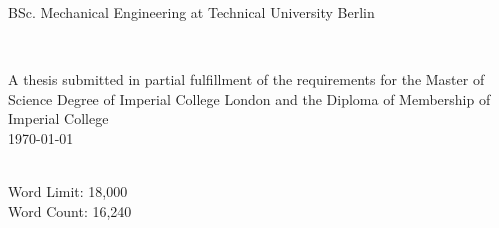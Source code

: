 \begin{titlepage}
\begin{minipage}{0.4\textwidth}
\centering \large
BSc. Mechanical Engineering at Technical University Berlin \\[1.2em] %
\end{minipage}\\[1cm]
\makeatother %
 \begin{minipage}{1\textwidth}
    \centering \large
    A thesis submitted in partial fulfillment of the requirements for the Master of Science Degree of  Imperial College London and the Diploma of Membership of Imperial College \\[0.9cm] 
    {\today}\\[0.1cm] 
    \begin{center}
        Word Limit: 18,000\\
        Word Count: 16,240     
    \end{center}
\end{minipage}\\ 
                  




\makeatother

\end{titlepage}